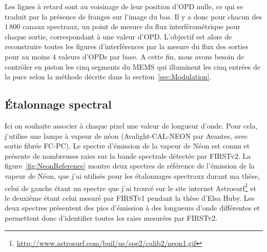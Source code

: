 Les lignes à retard sont au voisinage de leur position d'\ac{OPD} nulle, ce qui se traduit par la présence de franges sur l'image du bas. Il y a donc pour chacun des $1\,800$ canaux spectraux, un point de mesure du flux interférométrique pour chaque sortie, correspondant à une valeur d'\ac{OPD}. L'objectif est alors de reconstruire toutes les figures d'interférences par la mesure du flux des sorties pour au moins $4$ valeurs d'\ac{OPD}s par base. A cette fin, nous avons besoin de contrôler en piston les cinq segments du \ac{MEMS} qui illuminent les cinq entrées de la puce selon la méthode décrite dans la section~\ref{sec:Modulation}.


\subsection{Étalonnage spectral}
\label{sec:EtalonnageSpectral}

Ici on souhaite associer à chaque pixel une valeur de longueur d'onde. Pour cela, j'utilise une lampe à vapeur de néon (Avalight-CAL-NEON par Avantes, avec sortie fibrée FC-PC). Le spectre d'émission de la vapeur de Néon est connu et présente de nombreuses raies sur la bande spectrale détectée par \ac{FIRSTv2}. La figure~\ref{fig:NeonReference} montre deux spectres de référence de l'émission de la vapeur de Néon, que j'ai utilisés pour les étalonnages spectraux durant ma thèse, celui de gauche étant un spectre que j'ai trouvé sur le site internet Astrosurf\footnote{\url{http://www.astrosurf.com/buil/us/spe2/calib2/neon1.gif}} et le deuxième étant celui mesuré par \ac{FIRSTv1} pendant la thèse d'Elsa Huby. Les deux spectres présentent des pics d'émission à des longueurs d'onde différentes et permettent donc d'identifier toutes les raies mesurées par \ac{FIRSTv2}.

